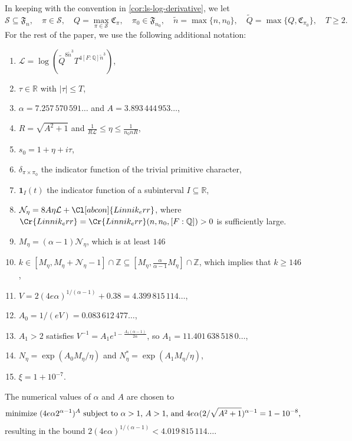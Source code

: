 \documentclass[11pt]{amsart}
\theoremstyle{remark}
\numberwithin{equation}{section}
\newcommand{\Z}{\mathbb{Z}}
\newcommand{\R}{\mathbb{R}}
\newcommand{\Q}{\mathbb{Q}}
\renewcommand{\tilde}{\widetilde}
\begin{document}
In keeping with the convention in \cref{cor:ls-log-derivative}, we let
\[
\mathcal{S}\subseteq\mathfrak{F}_n,\quad\pi\in\mathcal{S},\quad Q=\max_{\pi\in\mathcal{S}}\mathfrak{C}_{\pi},\quad\pi_0\in\mathfrak{F}_{n_0},\quad\tilde{n}=\max\{n,n_0\},\quad\tilde{Q}=\max\{Q,\mathfrak{C}_{\pi_0}\},\quad T\geq 2.
\]
For the rest of the paper, we use the following additional notation:
\begin{enumerate}[label=(\roman*)]
	\item $\mathcal{L}=\log(\tilde{Q}^{8\tilde{n}^3}T^{4[F:\Q]\tilde{n}^3})$,
	\item $\tau\in\R$ with $|\tau|\leq T$,
	\item $\alpha = 7.257\,570\,591\ldots$ and $A=3.893\,444\,953\ldots$,
	\item $R=\sqrt{A^2+1}$ and $\frac{1}{R\mathcal{L}}\leq \eta\leq \frac{1}{n_0 n R}$,
	\item $s_0=1+\eta+i\tau$,
	\item $\delta_{\pi\times\pi_0}$ the indicator function of the trivial primitive character,
	\item $\mathbf{1}_{I}(t)$ the indicator function of a subinterval $I\subseteq\R$,
	\item $\mathcal{N}_{\eta}=8A\eta\mathcal{L}+\Cl[abcon]{Linnik_err}$, where $\Cr{Linnik_err}=\Cr{Linnik_err}(n,n_0,[F:\Q])>0$ is sufficiently large.
	\item $M_{\eta}=(\alpha-1)\mathcal{N}_{\eta}$, which is at least $146$
	\item $k\in[M_{\eta},M_{\eta}+\mathcal{N}_{\eta}-1]\cap\Z\subseteq [M_{\eta},\frac{\alpha}{\alpha-1}M_{\eta}]\cap\Z$, which implies that $k\geq 146$,
	\item $V=2(4e\alpha)^{1/(\alpha-1)}+0.38=4.399\,815\,114\ldots$,
	\item $A_0 = 1/(eV)=0.083\,612\,477\ldots$,
	\item $A_{1} >2$ satisfies $V^{-1}=A_{1}  e^{1-\frac{A_{1} (\alpha-1)}{2\alpha}}$, so $A_{1}  = 11.401\,638\,518\,0\ldots$,
	\item $N_{\eta} = \exp(A_{0} M_{\eta}/\eta)$	and $N_{\eta}^{*}  = \exp(A_{1}  M_{\eta}/\eta)$,
	\item $\xi=1+10^{-7}$.
\end{enumerate}
The numerical values of $\alpha$ and $A$ are chosen to
\begin{equation}
\label{eqn:minimization_problem}
\textup{minimize $(4e\alpha 2^{\alpha-1})^A$ subject to $\alpha > 1$, $A>1$, and $4e\alpha(2/\sqrt{A^2+1})^{\alpha-1}=1-10^{-8}$,}
\end{equation}
resulting in the bound $2(4e\alpha)^{1/(\alpha-1)}<4.019\,815\,114\ldots$.
\end{document}
